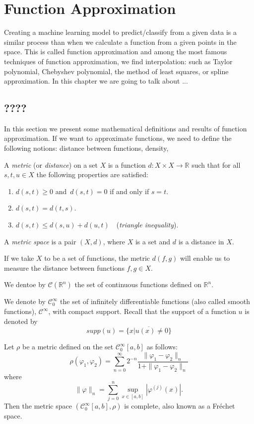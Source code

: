 \documentclass[../main.tex]{subfiles}
\begin{document}
\chapter{Function Approximation} \label{ch:methods}
\noindent Creating a machine learning model to predict/classify from a given data is a similar process than when we calculate a function from a given points in the space. This is called function approximation and among the most famous techniques of function approximation, we find interpolation: such as Taylor polynomial, Chebyshev polynomial, the method of least squares, or spline approximation. In this chapter we are going to talk about ...
\section{????}
\noindent In this section we present some mathematical definitions and results of function approximation. 
If we want to approximate functions, we need to define the following notions: distance between functions, density,


\begin{definition}\label{thm:first}
	A \emph{metric} (or \emph{distance}) on a set $X$ is a function $d:X\times X\rightarrow \mathbb{R} $ such that for all $s,t, u\in X$ the following properties are satisfied:
	\begin{enumerate}
		\item $d(s,t) \geq 0$ and $ \, d(s,t)=0$ if and only if $ s=t$.
		\item $d(s,t)=d(t,s)$.
		\item $d(s,t)\leq d(s,u)+d(u,t)\quad$(\emph{triangle inequality}).
	\end{enumerate}
A \emph{metric space} is a pair $(X,d)$, where $X$ is a set and $d$ is a distance in $X$.
\end{definition}
\noindent  If we take $X$ to be a set of functions, the metric $d(f,g)$ will enable us to measure the distance between functions $f,g \in X$.


\begin{definition} We dentoe by $\mathcal{C}(\mathbb{R}^n)$ the set of continuous functions defined on $\mathbb{R}^n$.
\end{definition}

\begin{definition} We denote by
	$ \mathcal{C}^\infty_0$ the set of infinitely differentiable functions (also called smooth functions), $\mathcal{C}^\infty$, with compact support. Recall that the support of a function $u$ is denoted by $$supp(u)= \overline{\{x | u(x)\neq 0\}}$$
\end{definition}
\begin{propo} \label{prop:frech}
Let $\rho$ be a metric defined on the set $\mathcal{C}^\infty_0[a,b]$ as follows:
$$\rho(\varphi_1,\varphi_2) = \sum_{n=0}^\infty 2^{-n}  \frac{\|\varphi_1 -\varphi_2\|_n}{1+\|\varphi_1 -\varphi_2\|_n}$$ where $$\|\varphi\|_n= \sum_{j=0}^n \sup_{x\in [a,b]} | \varphi^{(j)}(x)|. $$  Then the metric space $(\mathcal{C}^\infty_0[a,b],\rho)$  is complete, also known as a Fréchet space.
\end{propo}
\end{document}
